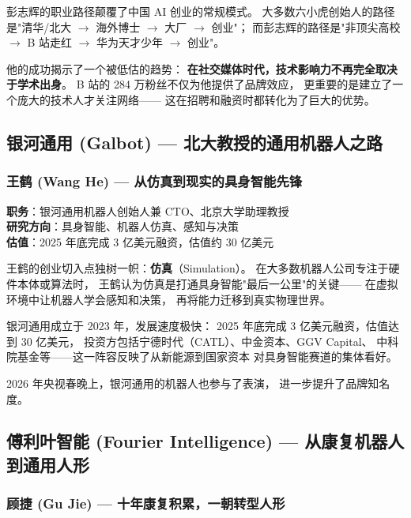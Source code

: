 \begin{whybox}
彭志辉的职业路径颠覆了中国 AI 创业的常规模式。
大多数六小虎创始人的路径是"清华/北大 $\to$ 海外博士 $\to$ 大厂 $\to$ 创业"；
而彭志辉的路径是"非顶尖高校 $\to$ B 站走红 $\to$ 华为天才少年 $\to$ 创业"。

他的成功揭示了一个被低估的趋势：
\textbf{在社交媒体时代，技术影响力不再完全取决于学术出身}。
B 站的 284 万粉丝不仅为他提供了品牌效应，
更重要的是建立了一个庞大的技术人才关注网络——
这在招聘和融资时都转化为了巨大的优势。
\end{whybox}


\subsection{银河通用 (Galbot) — 北大教授的通用机器人之路}

\subsubsection{王鹤 (Wang He) — 从仿真到现实的具身智能先锋}

\begin{keybox}[人物档案：王鹤]
\textbf{职务}：银河通用机器人创始人兼 CTO、北京大学助理教授 \\
\textbf{研究方向}：具身智能、机器人仿真、感知与决策 \\
\textbf{估值}：2025 年底完成 3 亿美元融资，估值约 30 亿美元
\end{keybox}

王鹤的创业切入点独树一帜：\textbf{仿真}（Simulation）。
在大多数机器人公司专注于硬件本体或算法时，
王鹤认为仿真是打通具身智能"最后一公里"的关键——
在虚拟环境中让机器人学会感知和决策，
再将能力迁移到真实物理世界。

银河通用成立于 2023 年，发展速度极快：
2025 年底完成 3 亿美元融资，估值达到 30 亿美元，
投资方包括宁德时代（CATL）、中金资本、GGV Capital、
中科院基金等——这一阵容反映了从新能源到国家资本
对具身智能赛道的集体看好。

2026 年央视春晚上，银河通用的机器人也参与了表演，
进一步提升了品牌知名度。


\subsection{傅利叶智能 (Fourier Intelligence) — 从康复机器人到通用人形}

\subsubsection{顾捷 (Gu Jie) — 十年康复积累，一朝转型人形}

